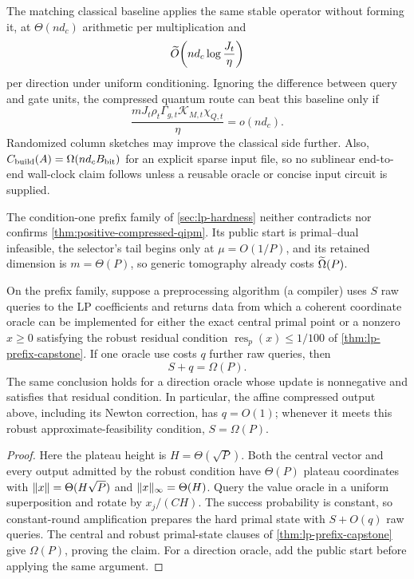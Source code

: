 The matching classical baseline applies the same stable operator without
forming it, at $\Theta(nd_c)$ arithmetic per multiplication and
\begin{equation}
 \widetilde{O}\!\left(nd_c\log\frac{J_t}{\eta}\right)           \label{eq:positive-classical-krylov}
\end{equation}
per direction under uniform conditioning.  Ignoring the difference between
query and gate units, the compressed quantum route can beat this baseline only
if
\begin{equation}
 \frac{mJ_t\rho_t\Gamma_{g,t}\mathcal K_{M,t}\chi_{Q,t}}{\eta}
 =o(nd_c).                                                \label{eq:positive-compressed-regime}
\end{equation}
Randomized column sketches may improve the classical side further.  Also,
$C_{\rm build}(A)=\Omega(nd_cB_{\rm bit})$ for an explicit sparse input file,
so no sublinear end-to-end wall-clock claim follows unless a reusable oracle
or concise input circuit is supplied.

The condition-one prefix family of \cref{sec:lp-hardness} neither contradicts
nor confirms \cref{thm:positive-compressed-qipm}.  Its public start
is primal--dual infeasible, the selector's tail begins only at $\mu=O(1/P)$,
and its retained dimension is $m=\Theta(P)$, so generic tomography already
costs $\widetilde{\Omega}(P)$.

\begin{proposition}
\label{prop:positive-compiler-bound}
On the prefix family, suppose a preprocessing algorithm (a compiler) uses $S$
raw queries to the LP coefficients and returns data from which a coherent
coordinate oracle can be implemented for either the exact central
primal point or a nonzero $x\geq0$ satisfying the robust residual condition
$\operatorname{res}_p(x)\leq1/100$ of
\cref{thm:lp-prefix-capstone}.  If one oracle use costs $q$ further raw
queries, then
\begin{equation}
 S+q=\Omega(P).                                         \label{eq:positive-compiler-bound}
\end{equation}
The same conclusion holds for a direction oracle whose update is nonnegative
and satisfies that residual condition.  In particular, the affine compressed
output above, including its Newton correction, has $q=O(1)$; whenever it meets
this robust approximate-feasibility condition, $S=\Omega(P)$.
\end{proposition}

\begin{proof}
Here the plateau height is $H=\Theta(\sqrt P)$.  Both the central vector and
every output admitted by the robust condition have $\Theta(P)$ plateau
coordinates with
$\lVert x\rVert=\Theta(H\sqrt P)$ and $\lVert x\rVert_\infty=\Theta(H)$.  Query the value
oracle in a uniform superposition and rotate by $x_j/(CH)$.  The success
probability is constant, so constant-round amplification prepares the hard
primal state with $S+O(q)$ raw queries.  The central and robust primal-state
clauses of \cref{thm:lp-prefix-capstone} give $\Omega(P)$, proving the claim.
For a direction oracle, add the public start before applying the same argument.
\end{proof}


